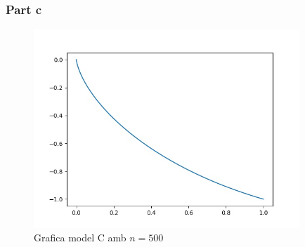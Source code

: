 \documentclass[12pt, a4papre]{article}
\begin{document}
	\subsubsection{Part c}
	
	\begin{figure}[H]
		\begin{center}
		\includegraphics[width=100mm]{modelC500.jpg}
		\end{center}
		\caption{Grafica model C amb $n = 500$}
		

\end{figure}
\end{document}
